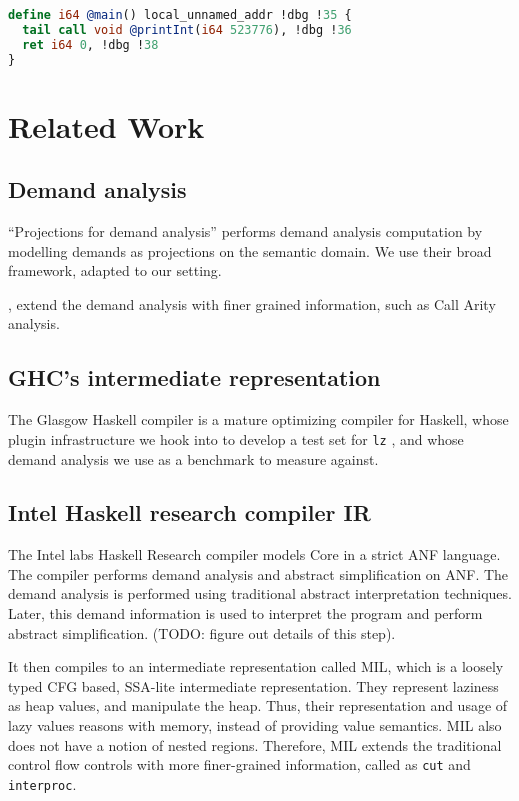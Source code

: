 \documentclass[sigplan,\review anonymous]{acmart}
\newcommand{\lz}{\texttt{lz} }
\begin{document}
{\begin{lstlisting}[language=llvm, caption="final LLVM program after lowering"]
define i64 @main() local_unnamed_addr !dbg !35 {
  tail call void @printInt(i64 523776), !dbg !36
  ret i64 0, !dbg !38
}
\end{lstlisting}

\section{Related Work}

\subsection{Demand analysis}
\cite{wadler1987projections} ``Projections for demand analysis'' performs
demand analysis computation by modelling demands as projections on the semantic
domain. We use their broad framework, adapted to our setting. 

\cite{grafcall}, \cite{breitner2014call} extend the demand analysis with
finer grained information, such as Call Arity analysis.

\subsection{GHC's intermediate representation}

The Glasgow Haskell compiler \cite{jones1993glasgow} is a mature optimizing
compiler for Haskell, whose plugin infrastructure we hook into to  develop a test
set for \lz, and whose demand analysis we use as a benchmark to measure against.

\subsection{Intel Haskell research compiler IR}
The Intel labs Haskell Research compiler \cite{liu2013intel} models Core in a
strict ANF language. The compiler performs demand analysis and abstract
simplification on ANF. The demand analysis is performed using traditional
abstract interpretation techniques. Later, this demand information is used
to interpret the program and perform abstract simplification. (TODO: figure out
details of this step).

It then compiles to an intermediate representation called MIL,
which is a loosely typed CFG based, SSA-lite intermediate representation.  They
represent laziness as heap values, and manipulate the heap. Thus, their
representation and usage of lazy values reasons with memory, instead of
providing value semantics.
MIL also does not have a notion of nested regions. Therefore, MIL extends
the traditional control flow controls with more finer-grained information,
called as \texttt{cut} and \texttt{interproc}.


}
\end{document}
